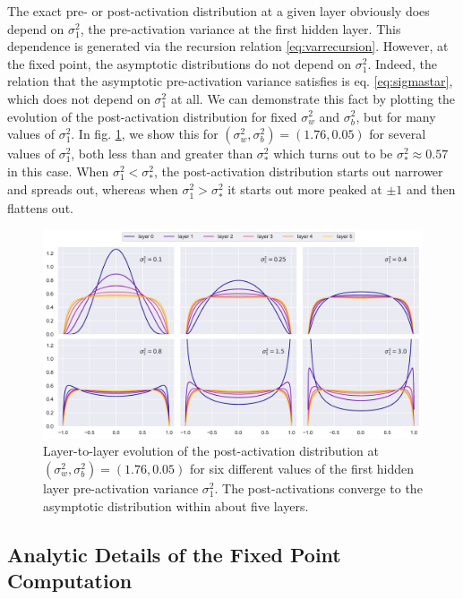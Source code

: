 The exact pre- or post-activation distribution at a given layer obviously does depend on $\sigma_{1}^{2}$, the pre-activation variance at the first hidden layer. This dependence is generated via the recursion relation \eqref{eq:varrecursion}. However, at the fixed point, the asymptotic distributions do not depend on $\sigma_{1}^{2}$. Indeed, the relation that the asymptotic pre-activation variance satisfies is eq. \eqref{eq:sigmastar}, which does not depend on $\sigma_{1}^{2}$ at all. We can demonstrate this fact by plotting the evolution of the post-activation distribution for fixed $\sigma_{w}^{2}$ and $\sigma_{b}^{2}$, but for many values of $\sigma_{1}^{2}$. In fig. \ref{fig:postevol}, we show this for $( \sigma_{w}^{2} , \sigma_{b}^{2} ) = (1.76, 0.05)$ for several values of $\sigma_{1}^{2}$, both less than and greater than $\sigma_{*}^{2}$ which turns out to be $\sigma_{*}^{2} \approx 0.57$ in this case. When $\sigma_{1}^{2} < \sigma_{*}^{2}$, the post-activation distribution starts out narrower and spreads out, whereas when $\sigma_{1}^{2} > \sigma_{*}^{2}$ it starts out more peaked at $\pm 1$ and then flattens out.
%
\begin{figure}[h!]
	\centering
	\includegraphics[width=\textwidth]{figures/chapter4/propagation_v2.pdf}
	\caption{Layer-to-layer evolution of the post-activation distribution at $( \sigma_{w}^{2} , \sigma_{b}^{2} ) = (1.76, 0.05)$ for six different values of the first hidden layer pre-activation variance $\sigma_{1}^{2}$. The post-activations converge to the asymptotic distribution within about five layers.}
	\label{fig:postevol}
\end{figure}

\subsection{Analytic Details of the Fixed Point Computation}
\label{app:analytics}

